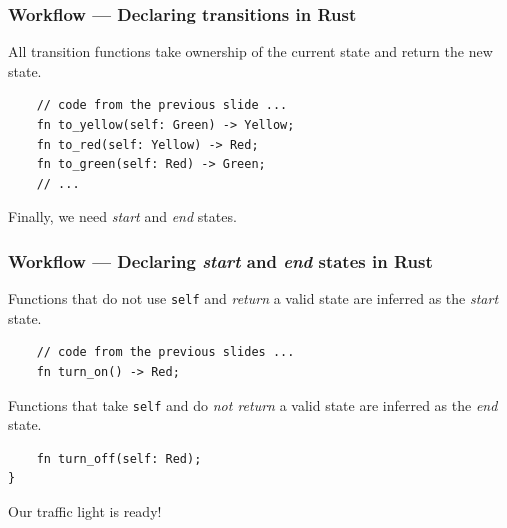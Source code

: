 \documentclass[bigger,notes,aspectratio=169]{beamer}
\begin{document}
\begin{frame}[fragile]
    \frametitle{Workflow --- Declaring transitions in Rust}
    All transition functions take ownership of the current state and return the new state.
    \begin{listing}
        \centering
        \begin{verbatim}
    // code from the previous slide ...
    fn to_yellow(self: Green) -> Yellow;
    fn to_red(self: Yellow) -> Red;
    fn to_green(self: Red) -> Green;
    // ...
        \end{verbatim}
    \end{listing}
    Finally, we need \emph{start} and \emph{end} states.

\end{frame}

\begin{frame}[fragile]
    \frametitle{Workflow --- Declaring \emph{start} and \emph{end} states in Rust}
    Functions that do not use \texttt{self} and \emph{return} a valid state are inferred as the \emph{start} state.

    \begin{listing}
        \centering
        \begin{verbatim}
    // code from the previous slides ...
    fn turn_on() -> Red;
        \end{verbatim}
    \end{listing}

    Functions that take \texttt{self} and do \emph{not return }a valid state are inferred as the \emph{end} state.
    \begin{listing}
        \centering
        \begin{verbatim}
    fn turn_off(self: Red);
}
        \end{verbatim}
    \end{listing}
    Our traffic light is ready!

\end{frame}
\end{document}

